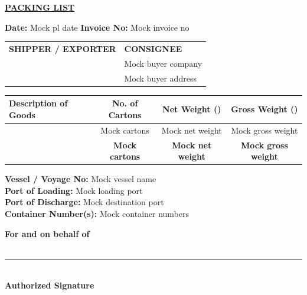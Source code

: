 \documentclass[a4paper,11pt]{article}
\begin{document}
\begin{center}
  {\Large\textbf{\underline{PACKING LIST}}}
\end{center}

\vspace{0.5cm}
\noindent \textbf{Date:} Mock pl date \hfill \textbf{Invoice No:} Mock invoice no

\vspace{0.5cm}
\noindent
\begin{tabularx}{\textwidth}{@{}X X@{}}
\textbf{SHIPPER / EXPORTER} & \textbf{CONSIGNEE} \\
 & Mock buyer company \\
 & Mock buyer address 
\end{tabularx}

\vspace{1cm}
\begin{center}
\begin{tabularx}{\textwidth}{|>{\raggedright\arraybackslash}X|c|c|c|}
\hline
\textbf{Description of Goods} & \textbf{No. of Cartons} & \textbf{Net Weight ()} & \textbf{Gross Weight ()} \\ \hline
 & Mock cartons & Mock net weight & Mock gross weight \\ \hline
\multicolumn{1}{|r|}{\textbf{TOTAL}} & \textbf{Mock cartons} & \textbf{Mock net weight} & \textbf{Mock gross weight} \\ \hline
\end{tabularx}
\end{center}

\vspace{0.5cm}
\noindent
\textbf{Vessel / Voyage No:} Mock vessel name\\
\textbf{Port of Loading:} Mock loading port\\
\textbf{Port of Discharge:} Mock destination port\\
\textbf{Container Number(s):} Mock container numbers

\vspace{1.5cm}
\noindent\textbf{For and on behalf of }\\
\vspace{1.5cm}\\
\rule{6cm}{0.4pt} \\
\textbf{Authorized Signature}
\end{document}
